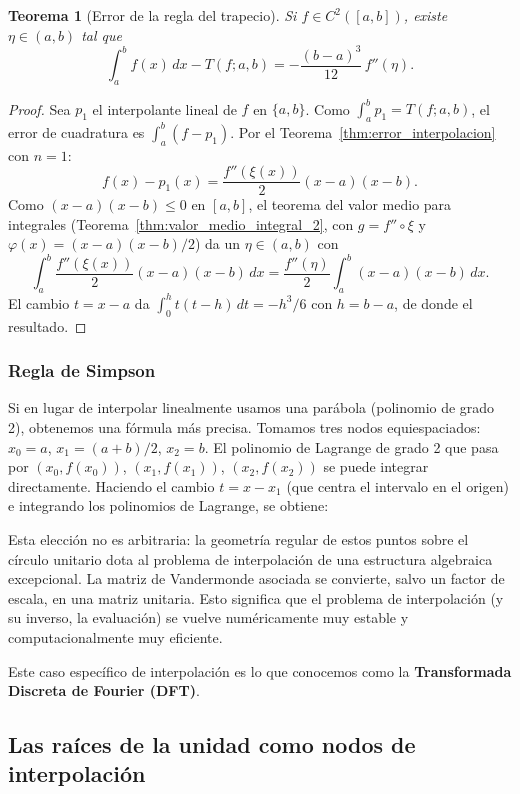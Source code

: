 \documentclass[a4paper,11pt]{report}
\newtheorem{theorem}{Teorema}[chapter]
\begin{document}
\begin{theorem}[Error de la regla del trapecio]\label{thm:error_trapecio}
Si $f\in C^2([a,b])$, existe $\eta\in(a,b)$ tal que
\[
\int_a^b f(x)\,dx - T(f;a,b) = -\frac{(b-a)^3}{12}\,f''(\eta).
\]
\end{theorem}
\begin{proof}
Sea $p_1$ el interpolante lineal de $f$ en $\{a,b\}$.  Como $\int_a^b p_1 = T(f;a,b)$, el error de cuadratura es $\int_a^b (f-p_1)$.  Por el Teorema~\ref{thm:error_interpolacion} con $n=1$:
\[
f(x)-p_1(x)=\frac{f''(\xi(x))}{2}(x-a)(x-b).
\]
Como $(x-a)(x-b)\le 0$ en $[a,b]$, el teorema del valor medio para integrales (Teorema~\ref{thm:valor_medio_integral_2}, con $g=f''\circ\xi$ y $\varphi(x)=(x-a)(x-b)/2$) da un $\eta\in(a,b)$ con
\[
\int_a^b \frac{f''(\xi(x))}{2}(x-a)(x-b)\,dx = \frac{f''(\eta)}{2}\int_a^b(x-a)(x-b)\,dx.
\]
El cambio $t=x-a$ da $\int_0^h t(t-h)\,dt = -h^3/6$ con $h=b-a$, de donde el resultado.
\end{proof}

\subsubsection{Regla de Simpson}\label{subsec:regla_simpson}

Si en lugar de interpolar linealmente usamos una parábola (polinomio de grado 2), obtenemos una fórmula más precisa.  Tomamos tres nodos equiespaciados: $x_0 = a$, $x_1 = (a+b)/2$, $x_2 = b$.  El polinomio de Lagrange de grado 2 que pasa por $(x_0, f(x_0))$, $(x_1, f(x_1))$, $(x_2, f(x_2))$ se puede integrar directamente.  Haciendo el cambio $t = x - x_1$ (que centra el intervalo en el origen) e integrando los polinomios de Lagrange, se obtiene:


Esta elección no es arbitraria: la geometría regular de estos puntos sobre el círculo unitario dota al problema de interpolación de una estructura algebraica excepcional. La matriz de Vandermonde asociada se convierte, salvo un factor de escala, en una matriz unitaria. Esto significa que el problema de interpolación (y su inverso, la evaluación) se vuelve numéricamente muy estable y computacionalmente muy eficiente.

Este caso específico de interpolación es lo que conocemos como la \textbf{Transformada Discreta de Fourier (DFT)}.

\subsection{Las raíces de la unidad como nodos de interpolación}
\end{document}
